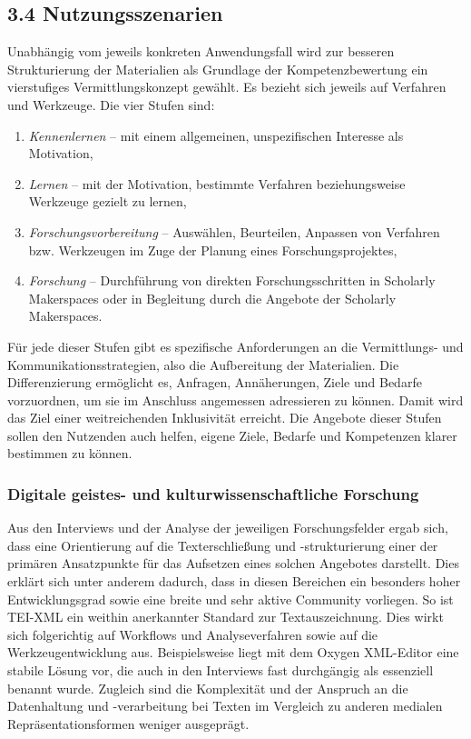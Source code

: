 \documentclass[a4paper,
fontsize=11pt,
oneside,
numbers=noperiodatend,
parskip=half-,
bibliography=totoc,
final
]{scrartcl}
\begin{document}
\hypertarget{nutzungsszenarien}{%
\subsection{3.4 Nutzungsszenarien}\label{nutzungsszenarien}}

Unabhängig vom jeweils konkreten Anwendungsfall wird zur besseren
Strukturierung der Materialien als Grundlage der Kompetenzbewertung ein
vierstufiges Vermittlungskonzept gewählt. Es bezieht sich jeweils auf
Verfahren und Werkzeuge. Die vier Stufen sind:

\begin{enumerate}
\def\labelenumi{\arabic{enumi}.}

\item
  \emph{Kennenlernen} -- mit einem allgemeinen, unspezifischen Interesse
  als Motivation,
\item
  \emph{Lernen} -- mit der Motivation, bestimmte Verfahren
  beziehungsweise Werkzeuge gezielt zu lernen,
\item
  \emph{Forschungsvorbereitung} -- Auswählen, Beurteilen, Anpassen von
  Verfahren bzw. Werkzeugen im Zuge der Planung eines
  Forschungsprojektes,
\item
  \emph{Forschung} -- Durchführung von direkten Forschungsschritten in
  Scholarly Makerspaces oder in Begleitung durch die Angebote der
  Scholarly Makerspaces.
\end{enumerate}

Für jede dieser Stufen gibt es spezifische Anforderungen an die
Vermittlungs- und Kommunikationsstrategien, also die Aufbereitung der
Materialien. Die Differenzierung ermöglicht es, Anfragen, Annäherungen,
Ziele und Bedarfe vorzuordnen, um sie im Anschluss angemessen
adressieren zu können. Damit wird das Ziel einer weitreichenden
Inklusivität erreicht. Die Angebote dieser Stufen sollen den Nutzenden
auch helfen, eigene Ziele, Bedarfe und Kompetenzen klarer bestimmen zu
können.

\hypertarget{digitale-geistes--und-kulturwissenschaftliche-forschung}{%
\subsubsection{Digitale geistes- und kulturwissenschaftliche
Forschung}\label{digitale-geistes--und-kulturwissenschaftliche-forschung}}

Aus den Interviews und der Analyse der jeweiligen Forschungsfelder ergab
sich, dass eine Orientierung auf die Texterschließung und
-strukturierung einer der primären Ansatzpunkte für das Aufsetzen eines
solchen Angebotes darstellt. Dies erklärt sich unter anderem dadurch,
dass in diesen Bereichen ein besonders hoher Entwicklungsgrad sowie eine
breite und sehr aktive Community vorliegen. So ist TEI-XML ein weithin
anerkannter Standard zur Textauszeichnung. Dies wirkt sich folgerichtig
auf Workflows und Analyseverfahren sowie auf die Werkzeugentwicklung
aus. Beispielsweise liegt mit dem Oxygen XML-Editor eine stabile Lösung
vor, die auch in den Interviews fast durchgängig als essenziell benannt
wurde. Zugleich sind die Komplexität und der Anspruch an die
Datenhaltung und -verarbeitung bei Texten im Vergleich zu anderen
medialen Repräsentationsformen weniger ausgeprägt.
\end{document}
